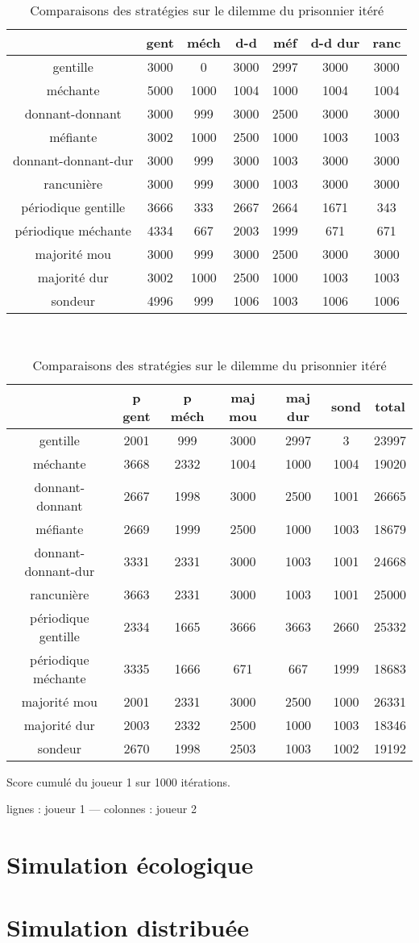\documentclass[10pt]{article}
\begin{document}
\begin{table}
\caption[Comparaison des stratégies]{Comparaisons des stratégies sur le dilemme du prisonnier itéré}
\label{strat_table}
\begin{center}
\begin{tabular}{|c|cccccc|}
\hline
& gent & méch & d-d & méf & d-d dur & ranc \\ \hline
gentille & 3000& 0& 3000& 2997& 3000& 3000\\
méchante & 5000& 1000& 1004& 1000& 1004& 1004\\
donnant-donnant & 3000& 999& 3000& 2500& 3000& 3000\\
méfiante & 3002& 1000& 2500& 1000& 1003& 1003\\
donnant-donnant-dur & 3000& 999& 3000& 1003& 3000& 3000\\
rancunière & 3000& 999& 3000& 1003& 3000& 3000\\
périodique gentille & 3666& 333& 2667& 2664& 1671& 343\\
périodique méchante & 4334& 667& 2003& 1999& 671& 671\\
majorité mou & 3000& 999& 3000& 2500& 3000& 3000\\
majorité dur & 3002& 1000& 2500& 1000& 1003& 1003\\
sondeur & 4996& 999& 1006& 1003& 1006& 1006\\
\hline
\end{tabular}
\\
\begin{tabular}{|c|cccccc|}
\hline
& p gent & p méch & maj mou & maj dur & sond & total \\ \hline
gentille & 2001& 999& 3000& 2997& 3& 23997\\
méchante & 3668& 2332& 1004& 1000& 1004& 19020\\
donnant-donnant & 2667& 1998& 3000& 2500& 1001& 26665\\
méfiante & 2669& 1999& 2500& 1000& 1003& 18679\\
donnant-donnant-dur & 3331& 2331& 3000& 1003& 1001& 24668\\
rancunière & 3663& 2331& 3000& 1003& 1001& 25000\\
périodique gentille & 2334& 1665& 3666& 3663& 2660& 25332\\
périodique méchante & 3335& 1666& 671& 667& 1999& 18683\\
majorité mou & 2001& 2331& 3000& 2500& 1000& 26331\\
majorité dur & 2003& 2332& 2500& 1000& 1003& 18346\\
sondeur & 2670& 1998& 2503& 1003& 1002& 19192\\
\hline
\end{tabular}
\end{center}
Score cumulé du joueur 1 sur 1000 itérations.

lignes : joueur 1 --- colonnes : joueur 2
\end{table}

\section{Simulation écologique}

\section{Simulation distribuée}
\end{document}
